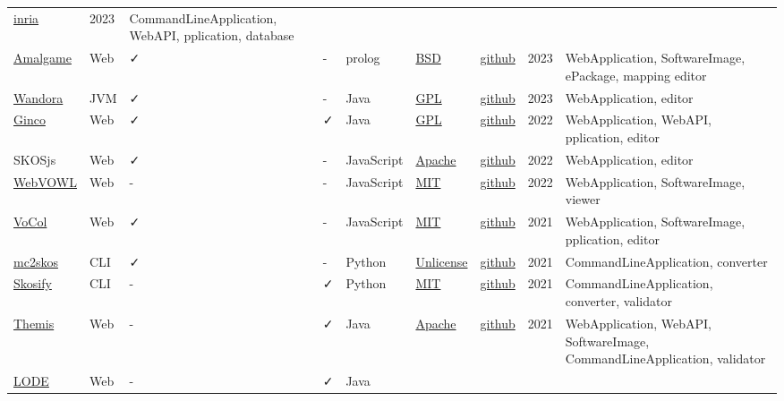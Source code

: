 \documentclass[
  DIV=10]{article}
\begin{document}
\begin{longtable}[]{@{}lllllllll@{}}
\href{https://gitlab.inria.fr/moex/alignapi/}{inria} & 2023 &
CommandLineApplication, WebAPI, pplication, database \\
\href{https://semanticweb.cs.vu.nl/amalgame/}{Amalgame} & Web & ✓ & - &
prolog & \href{https://spdx.org/licenses/BSD-3-Clause}{BSD} &
\href{https://github.com/jrvosse/amalgame}{github} & 2023 &
WebApplication, SoftwareImage, ePackage, mapping editor \\
\href{http://wandora.org/www/}{Wandora} & JVM & ✓ & - & Java &
\href{https://spdx.org/licenses/GPL-3.0-or-later}{GPL} &
\href{https://github.com/wandora-team/wandora}{github} & 2023 &
WebApplication, editor \\
\href{http://culturecommunication.github.io/ginco/}{Ginco} & Web & ✓ & ✓
& Java & \href{https://spdx.org/licenses/GPL-3.0-or-later}{GPL} &
\href{https://github.com/culturecommunication/ginco}{github} & 2022 &
WebApplication, WebAPI, pplication, editor \\
SKOSjs & Web & ✓ & - & JavaScript &
\href{https://spdx.org/licenses/Apache-2.0}{Apache} &
\href{https://github.com/tkurz/skosjs}{github} & 2022 & WebApplication,
editor \\
\href{https://service.tib.eu/webvowl/}{WebVOWL} & Web & - & - &
JavaScript & \href{https://spdx.org/licenses/MIT}{MIT} &
\href{https://github.com/VisualDataWeb/WebVOWL}{github} & 2022 &
WebApplication, SoftwareImage, viewer \\
\href{https://www.vocoreg.com/}{VoCol} & Web & ✓ & - & JavaScript &
\href{https://spdx.org/licenses/MIT}{MIT} &
\href{https://github.com/vocol/vocol}{github} & 2021 & WebApplication,
SoftwareImage, pplication, editor \\
\href{https://github.com/scriptotek/mc2skos}{mc2skos} & CLI & ✓ & - &
Python & \href{https://spdx.org/licenses/Unlicense}{Unlicense} &
\href{https://github.com/scriptotek/mc2skos}{github} & 2021 &
CommandLineApplication, converter \\
\href{https://skosify.readthedocs.io/en/latest/}{Skosify} & CLI & - & ✓
& Python & \href{https://spdx.org/licenses/MIT}{MIT} &
\href{https://github.com/NatLibFi/Skosify}{github} & 2021 &
CommandLineApplication, converter, validator \\
\href{http://themis.linkeddata.es/}{Themis} & Web & - & ✓ & Java &
\href{https://spdx.org/licenses/Apache-2.0}{Apache} &
\href{https://github.com/oeg-upm/Themis}{github} & 2021 &
WebApplication, WebAPI, SoftwareImage, CommandLineApplication,
validator \\
\href{https://essepuntato.it/lode/}{LODE} & Web & - & ✓ & Java &

\end{longtable}
\end{document}
